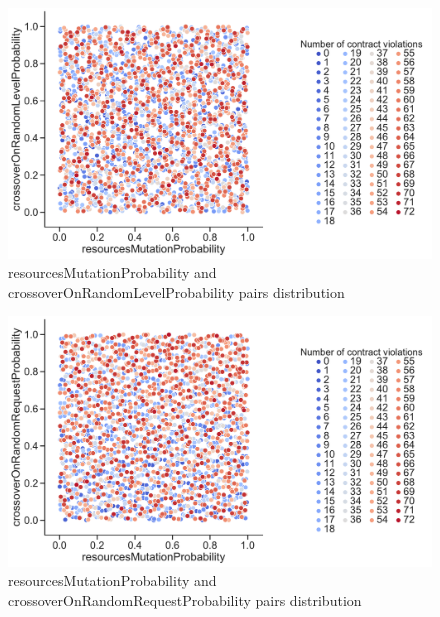 \begin{figure}
	\centering
	\includegraphics[width=\textwidth]{images/PairsDistr/resourcesMutationProbability_crossoverOnRandomLevelProbability.pdf}
	\caption[resourcesMutationProbability and crossoverOnRandomLevelProbability pairs distribution]{resourcesMutationProbability and crossoverOnRandomLevelProbability pairs distribution}       
	\label{fig:resourcesMutationProbability_crossoverOnRandomLevelProbability_pair}
\end{figure}
\begin{figure}
	\centering
	\includegraphics[width=\textwidth]{images/PairsDistr/resourcesMutationProbability_crossoverOnRandomRequestProbability.pdf}
	\caption[resourcesMutationProbability and crossoverOnRandomRequestProbability pairs distribution]{resourcesMutationProbability and crossoverOnRandomRequestProbability pairs distribution}   
	\label{fig:resourcesMutationProbability_crossoverOnRandomRequestProbability_pair}
\end{figure}
